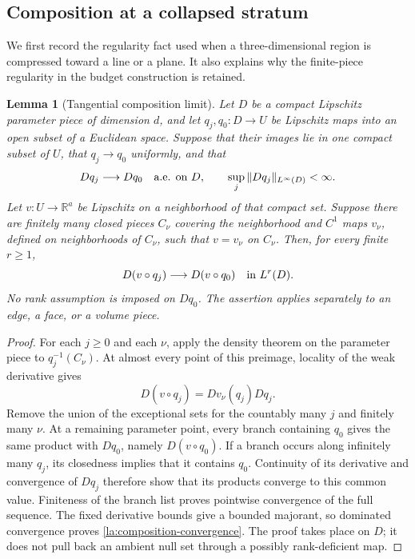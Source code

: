 \documentclass[11pt]{article}
\numberwithin{equation}{section}
\newtheorem{lemma}[theorem]{Lemma}
\theoremstyle{definition}
\theoremstyle{remark}
\begin{document}
\subsection{Composition at a collapsed stratum}

We first record the regularity fact used when a three-dimensional
region is compressed toward a line or a plane.  It also explains why
the finite-piece regularity in the budget construction is retained.

\begin{lemma}[Tangential composition limit]\label{la:composition-limit}
Let $D$ be a compact Lipschitz parameter piece of dimension $d$, and let
$q_j,q_0:D\to U$ be Lipschitz maps into an open subset of a Euclidean
space.  Suppose that their images lie in one compact subset of $U$,
that $q_j\to q_0$ uniformly, and that
\[
 Dq_j\longrightarrow Dq_0\quad\hbox{a.e. on }D,
 \qquad \sup_j\|Dq_j\|_{L^\infty(D)}<\infty.
\]
Let $v:U\to\mathbb R^a$ be Lipschitz on a neighborhood of that compact set.
Suppose there are finitely many closed pieces $C_\nu$ covering the
neighborhood and $C^1$ maps $v_\nu$, defined on neighborhoods of
$C_\nu$, such that $v=v_\nu$ on $C_\nu$.  Then, for every finite
$r\ge1$,
\begin{equation}\label{la:composition-convergence}
 D(v\circ q_j)\longrightarrow D(v\circ q_0)
       \quad\hbox{in }L^r(D).
\end{equation}
No rank assumption is imposed on $Dq_0$.  The assertion applies
separately to an edge, a face, or a volume piece.
\end{lemma}

\begin{proof}
For each $j\ge0$ and each $\nu$, apply the density theorem on the
parameter piece to $q_j^{-1}(C_\nu)$.  At almost every point of this
preimage, locality of the weak derivative gives
\[
 D(v\circ q_j)=Dv_\nu(q_j)Dq_j.
\]
Remove the union of the exceptional sets for the countably many $j$
and finitely many $\nu$.  At a remaining parameter point, every branch
containing $q_0$ gives the same product with $Dq_0$, namely
$D(v\circ q_0)$.  If a branch occurs along infinitely many $q_j$, its
closedness implies that it contains $q_0$.  Continuity of its
derivative and convergence of $Dq_j$ therefore show that its products
converge to this common value.  Finiteness of the branch list proves
pointwise convergence of the full sequence.  The fixed derivative
bounds give a bounded majorant, so dominated convergence proves
\eqref{la:composition-convergence}.  The proof takes place on $D$;
it does not pull back an ambient null set through a possibly
rank-deficient map.
\end{proof}
\end{document}

